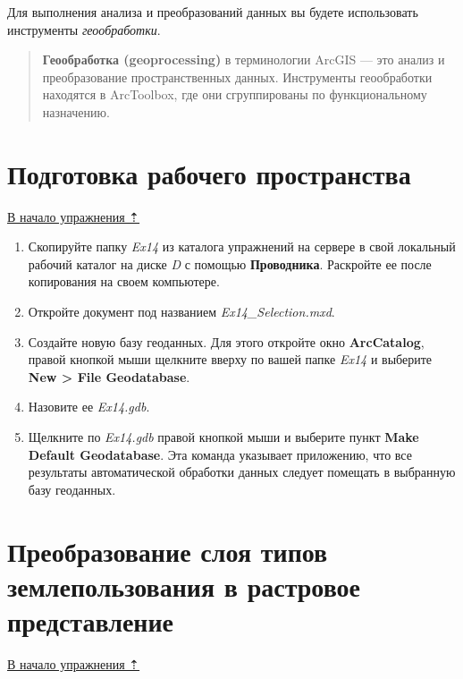 \documentclass[12pt,]{book}
\begin{document}
Для выполнения анализа и преобразований данных вы будете использовать
инструменты \emph{геообработки}.

\begin{quote}
\textbf{Геообработка (geoprocessing)} в терминологии ArcGIS --- это анализ и преобразование пространственных данных. Инструменты геообработки находятся в ArcToolbox, где они сгруппированы по функциональному назначению.
\end{quote}

\hypertarget{weighted-overlay-workspace}{%
\section{Подготовка рабочего пространства}\label{weighted-overlay-workspace}}

\protect\hyperlink{weighted-overlay}{В начало упражнения ⇡}

\begin{enumerate}
\def\labelenumi{\arabic{enumi}.}
\item
  Скопируйте папку \emph{Ex14} из каталога упражнений на сервере в свой локальный рабочий каталог на диске \emph{D} с помощью \textbf{Проводника}. Раскройте ее после копирования на своем компьютере.
\item
  Откройте документ под названием \emph{Ex14\_Selection.mxd}.
\item
  Создайте новую базу геоданных. Для этого откройте окно \textbf{ArcCatalog}, правой кнопкой мыши щелкните вверху по вашей папке \emph{Ex14} и выберите \textbf{New \textgreater{} File Geodatabase}.
\item
  Назовите ее \emph{Ex14.gdb}.
\item
  Щелкните по \emph{Ex14.gdb} правой кнопкой мыши и выберите пункт \textbf{Make Default Geodatabase}. Эта команда указывает приложению, что все результаты автоматической обработки данных следует помещать в выбранную базу геоданных.
\end{enumerate}

\hypertarget{weighted-overlay-rasterize}{%
\section{Преобразование слоя типов землепользования в растровое представление}\label{weighted-overlay-rasterize}}

\protect\hyperlink{ux432ux44bux431ux43eux440-ux43eux43fux442ux438ux43cux430ux43bux44cux43dux43eux433ux43e-ux43cux435ux441ux442ux43eux43fux43eux43bux43eux436ux435ux43dux438ux44f}{В начало упражнения ⇡}
\end{document}
